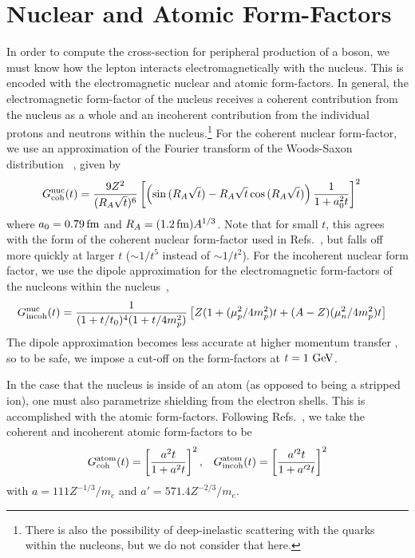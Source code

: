 \section{Nuclear and Atomic Form-Factors}\label{sec:form_factors}
In order to compute the cross-section for peripheral production of a boson, we must know how the lepton interacts electromagnetically with the nucleus. This is encoded with the electromagnetic nuclear and atomic form-factors. In general, the electromagnetic form-factor of the nucleus receives a coherent contribution from the nucleus as a whole and an incoherent contribution from the individual protons and neutrons within the nucleus.\footnote{There is also the possibility of deep-inelastic scattering with the quarks within the nucleons, but we do not consider that here.} For the coherent nuclear form-factor, we use an approximation of the Fourier transform of the Woods-Saxon distribution ~\cite{Klein:1999qj}, given by
\begin{align}
    G_{\rm coh}^{\rm nuc}(t) &= \frac{9Z^2}{(R_A\sqrt{t})^6}\left[\left(\sin{(R_A\sqrt{t})} - R_A \sqrt{t}\cos{(R_A\sqrt{t})}\right)\frac{1}{1+a_0^2t}\right]^2\label{eq:nuc_ff_coh}
\end{align}
where $a_0 = 0.79\,{\rm fm}$ and $R_A = (1.2\,{\rm fm})A^{1/3}$. Note that for small $t$, this agrees with the form of the coherent nuclear form-factor used in Refs.~\cite{Kim:1973he,Tsai:1973py}, but falls off more quickly at larger $t$ ($\sim 1/t^5$ instead of $\sim 1/t^2$). 
For the incoherent nuclear form factor, we use the dipole approximation for the electromagnetic form-factors of the nucleons within the nucleus~\cite{Kim:1973he,Tsai:1973py},
\begin{align}
    G_{\rm incoh}^{\rm nuc}(t) &= \frac{1}{(1+t/t_0)^4(1+t/4m_p^2)}\left[Z(1+(\mu_p^2/4m_p^2)t + (A-Z)(\mu_n^2/4m_p^2)t\right]
\end{align}
The dipole approximation becomes less accurate at higher momentum transfer \cite{Qattan:2024pco}, so to be safe, we impose a cut-off on the form-factors at $t = 1~{\rm GeV}$.

In the case that the nucleus is inside of an atom (as opposed to being a stripped ion), one must also parametrize shielding from the electron shells. This is accomplished with the atomic form-factors. Following Refs.~\cite{Kim:1973he,Tsai:1973py}, we take the coherent and incoherent atomic form-factors to be 
\begin{align}
    G_{\rm coh}^{\rm atom}(t) = \left[\frac{a^2t}{1+a^2t}\right]^2, && G_{\rm incoh}^{\rm atom}(t) = \left[\frac{a'^2t}{1+a'^2t}\right]^2
\end{align}
with $a = 111Z^{-1/3}/m_e$ and $a' = 571.4Z^{-2/3}/m_e$. 

